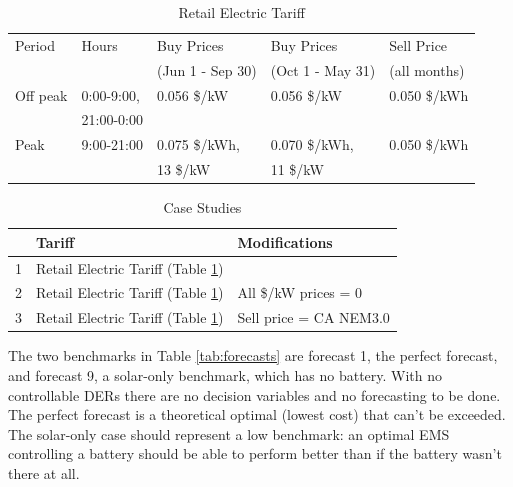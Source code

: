 \documentclass[conference]{IEEEtran}
\begin{document}
\begin{table}
    \centering
    \caption{Retail Electric Tariff}
    \label{tab:tariff}
    \setlength{\tabcolsep}{3pt}
    \begin{tabular}{l l l l l}
        \hline
        Period & Hours & Buy Prices & Buy Prices & Sell Price  \\
         &  & (Jun 1 - Sep 30) & (Oct 1 - May 31) & (all months) \\
        \hline
        \hline
        Off peak & 0:00-9:00,  & 0.056 \$/kW  & 0.056 \$/kW & 0.050 \$/kWh \\
                  & 21:00-0:00 &              &        &       \\
        \hline
        Peak     & 9:00-21:00   & 0.075 \$/kWh, & 0.070 \$/kWh, & 0.050 \$/kWh \\
                 &              & 13 \$/kW & 11 \$/kW & \\
        \hline
    \end{tabular}
\end{table}

\begin{table}
    \centering
    \caption{Case Studies}
    \label{tab:case-studies}
    \setlength{\tabcolsep}{3pt}
    \begin{tabular}{l l l}
        \hline
        & Tariff & Modifications \\
        \hline
        \hline
        1 & Retail Electric Tariff (Table \ref{tab:tariff}) & \\
        2 & Retail Electric Tariff (Table \ref{tab:tariff}) & All \$/kW prices = 0  \\
        3 & Retail Electric Tariff (Table \ref{tab:tariff}) & Sell price = CA NEM3.0 \\
        \hline
    \end{tabular}
\end{table}

The two benchmarks in Table \ref{tab:forecasts} are forecast 1, the perfect forecast, and forecast 9, a solar-only benchmark, which has no battery. With no controllable DERs there are no decision variables and no forecasting to be done. The perfect forecast is a theoretical optimal (lowest cost) that can't be exceeded. The solar-only case should represent a low benchmark: an optimal EMS controlling a battery should be able to perform better than if the battery wasn't there at all.  
\end{document}
